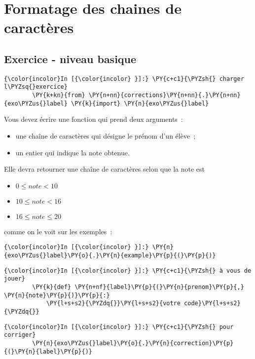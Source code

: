     \hypertarget{formatage-des-chaines-de-caractuxe8res}{%
\section{Formatage des chaines de
caractères}\label{formatage-des-chaines-de-caractuxe8res}}

    \hypertarget{exercice---niveau-basique}{%
\subsection{Exercice - niveau basique}\label{exercice---niveau-basique}}

    \begin{Verbatim}[commandchars=\\\{\}]
{\color{incolor}In [{\color{incolor} }]:} \PY{c+c1}{\PYZsh{} charger l\PYZsq{}exercice}
        \PY{k+kn}{from} \PY{n+nn}{corrections}\PY{n+nn}{.}\PY{n+nn}{exo\PYZus{}label} \PY{k}{import} \PY{n}{exo\PYZus{}label}
\end{Verbatim}


    Vous devez écrire une fonction qui prend deux arguments~:

\begin{itemize}
\tightlist
\item
  une chaîne de caractères qui désigne le prénom d'un élève~;
\item
  un entier qui indique la note obtenue.
\end{itemize}

Elle devra retourner une chaîne de caractères selon que la note est

\begin{itemize}
\tightlist
\item
  \(0 \leqslant note \lt 10\)
\item
  \(10 \leqslant note \lt 16\)
\item
  \(16 \leqslant note \leqslant 20\)
\end{itemize}

comme on le voit sur les exemples~:

    \begin{Verbatim}[commandchars=\\\{\}]
{\color{incolor}In [{\color{incolor} }]:} \PY{n}{exo\PYZus{}label}\PY{o}{.}\PY{n}{example}\PY{p}{(}\PY{p}{)}
\end{Verbatim}


    \begin{Verbatim}[commandchars=\\\{\}]
{\color{incolor}In [{\color{incolor} }]:} \PY{c+c1}{\PYZsh{} à vous de jouer}
        \PY{k}{def} \PY{n+nf}{label}\PY{p}{(}\PY{n}{prenom}\PY{p}{,} \PY{n}{note}\PY{p}{)}\PY{p}{:}
            \PY{l+s+s2}{\PYZdq{}}\PY{l+s+s2}{votre code}\PY{l+s+s2}{\PYZdq{}}
\end{Verbatim}


    \begin{Verbatim}[commandchars=\\\{\}]
{\color{incolor}In [{\color{incolor} }]:} \PY{c+c1}{\PYZsh{} pour corriger}
        \PY{n}{exo\PYZus{}label}\PY{o}{.}\PY{n}{correction}\PY{p}{(}\PY{n}{label}\PY{p}{)}
\end{Verbatim}